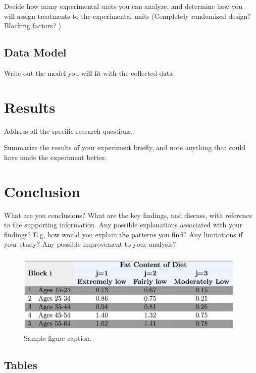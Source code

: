 \documentclass{article} %
\begin{document}
Decide how many experimental units you can analyze, and determine how you will assign treatments to the experimental units (Completely randomized design?  Blocking factors? )


\subsection{Data Model}
Write out the model you will fit with the collected data




\section{Results}

Address all the specific research questions.

Summarize the results of your experiment briefly, and note anything that could have made the experiment better.

\section{Conclusion}

What are you conclusions? What are the key findings, and discuss, with reference to the supporting information. Any possible explanations associated with your findings? E.g, how would you explain the patterns you find? Any limitations if your study? Any possible improvement to your analysis?



\begin{figure}[h]
\begin{center}
\includegraphics[height=4cm, width=12cm]{1.png}
\end{center}
\caption{Sample figure caption.}
\end{figure}

\subsection{Tables}
\end{document}
